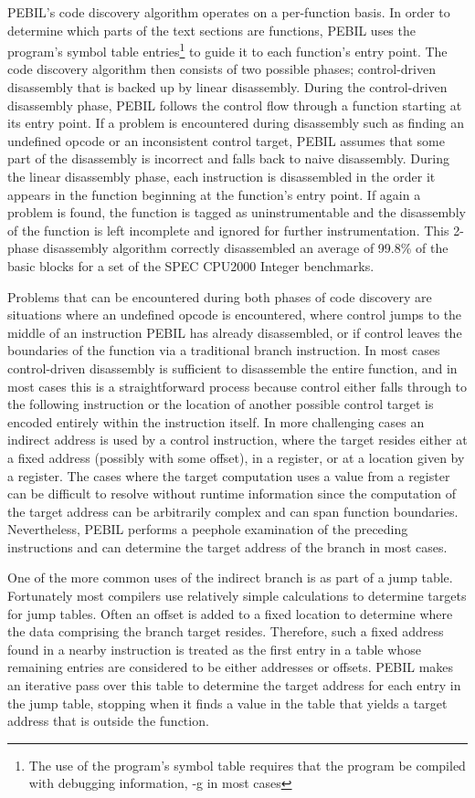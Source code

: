 PEBIL's code discovery algorithm operates on a per-function basis. In order to
determine which parts of the text sections are functions, PEBIL uses the
program's symbol table entries\footnote{The use of the program's symbol table
requires that the program be compiled with debugging information, -g in most
cases} to guide it to each function's entry point. The code discovery algorithm
then consists of two possible phases; control-driven disassembly that is backed
up by linear disassembly. During the control-driven disassembly phase, PEBIL
follows the control flow through a function starting at its entry point. If a
problem is encountered during disassembly such as finding an undefined opcode or
an inconsistent control target, PEBIL assumes that some part of the disassembly
is incorrect and falls back to naive disassembly. During the linear disassembly
phase, each instruction is disassembled in the order it appears in the function
beginning at the function's entry point. If again a problem is found, the
function is tagged as uninstrumentable and the disassembly of the function is
left incomplete and ignored for further instrumentation. This 2-phase
disassembly algorithm correctly disassembled an average of 99.8\% of the basic
blocks for a set of the SPEC CPU2000 Integer benchmarks.

Problems that can be encountered during both phases of code discovery are
situations where an undefined opcode is encountered, where control jumps to the
middle of an instruction PEBIL has already disassembled, or if control leaves
the boundaries of the function via a traditional branch instruction. In most
cases control-driven disassembly is sufficient to disassemble the entire
function, and in most cases this is a straightforward
process because control either falls through to the following instruction or the
location of another possible control target is encoded entirely within the
instruction itself. In more challenging cases an indirect address is used
by a control instruction, where the target resides either at a fixed address
(possibly with some offset), in a register, or at a location given by a
register. The cases where the target computation uses a value from a register 
can be difficult to resolve without runtime
information since the computation of the target address can be arbitrarily
complex and can span function boundaries. Nevertheless, PEBIL performs a
peephole examination of the preceding instructions and can determine the target
address of the branch in most cases.

One of the more common uses of the indirect branch is as part of a jump table.
Fortunately most compilers use relatively simple calculations to determine
targets for jump tables. Often an offset is added to a fixed location to
determine where the data comprising the branch target resides. Therefore, such a
fixed address found in a nearby instruction is treated as the first entry in a
table whose remaining entries are considered to be either addresses or offsets.
PEBIL makes an iterative pass over this table to determine the target address
for each entry in the jump table, stopping when it finds a value in the table
that yields a target address that is outside the function.

